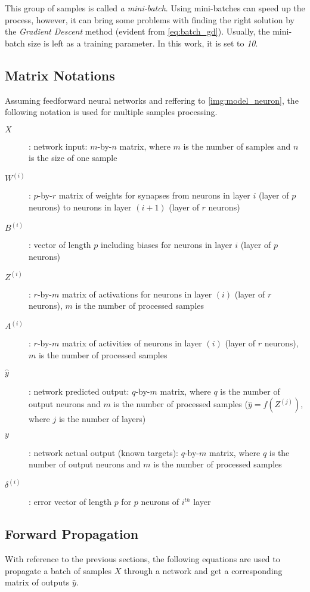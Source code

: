 This group of samples is called \textit{a mini-batch}. Using mini-batches can speed up the process, however, it can bring some problems with finding the right solution by the \textit{Gradient Descent} method (evident from \cref{eq:batch_gd}). Usually, the mini-batch size is left as a training parameter. In this work, it is set to \textit{10}.

\subsection{Matrix Notations} \label{ssec:matrix_notation}
Assuming feedforward neural networks and reffering to \cref{img:model_neuron}, the following notation is used for multiple samples processing.

\begin{description}
\item[$ X $] : network input: $ m $-by-$ n $ matrix, where $ m $ is the number of samples and $ n $ is the size of one sample
\item[$ W^{(i)} $] : $ p $-by-$ r $ matrix of weights for synapses from neurons in layer $ i $ (layer of $ p $ neurons) to neurons in layer $ (i+1) $ (layer of $ r $ neurons)
\item[$ B^{(i)} $] : vector of length $ p $ including biases for neurons in layer $ i $ (layer of $ p $ neurons)
\item[$ Z^{(i)} $] : $ r $-by-$ m $ matrix of activations for neurons in layer $ (i) $ (layer of $ r $ neurons), $ m $ is the number of processed samples
\item[$ A^{(i)} $] : $ r $-by-$ m $ matrix of activities of neurons in layer $ (i) $ (layer of $ r $ neurons), $ m $ is the number of processed samples
\item[$ \hat{y} $] : network predicted output: $ q $-by-$ m $ matrix, where $ q $ is the number of output neurons and $ m $ is the number of processed samples ($ \hat{y} = f(Z^{(j)}) $, where $ j $ is the number of layers)
\item[$ y $] : network actual output (known targets): $ q $-by-$ m $ matrix, where $ q $ is the number of output neurons and $ m $ is the number of processed samples
\item[$ \delta^{(i)} $] : error vector of length $ p $ for $ p $ neurons of $ i^{th} $ layer
\end{description}

\subsection{Forward Propagation} \label{ssec:forward_propagation}
With reference to the previous sections, the following equations are used to propagate a batch of samples $ X $ through a network and get a corresponding matrix of outputs $ \hat{y} $.

